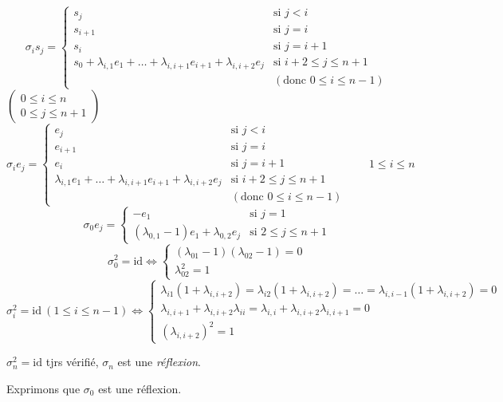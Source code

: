 \documentclass[11pt,a4paper]{article}
\begin{document}
\[
\sigma_i s_j =
\begin{cases}
s_j & \text{si } j<i \\
s_{i+1} & \text{si } j=i \\
s_i & \text{si } j=i+1 \\
s_0+\lambda_{i,1}e_1+\dots+\lambda_{i,i+1}e_{i+1}+\lambda_{i,i+2}e_j & \text{si } i+2\leq j\leq n+1 \\
 & (\text{donc } 0\leq i\leq n-1)
\end{cases}
\]
$\begin{pmatrix} 0\leq i\leq n \\ 0\leq j\leq n+1 \end{pmatrix}$ 
\[
\sigma_i e_j =
\begin{cases}
e_j & \text{si } j<i \\
e_{i+1} & \text{si } j=i \\
e_i & \text{si } j=i+1 \\
\lambda_{i,1}e_1+\dots+\lambda_{i,i+1}e_{i+1}+\lambda_{i,i+2}e_j & \text{si } i+2\leq j\leq n+1 \\
 & (\text{donc } 0\leq i\leq n-1)
\end{cases}
\qquad 1\leq i\leq n
\]
\[
\sigma_0 e_j =
\begin{cases}
-e_1 & \text{si } j=1 \\
(\lambda_{0,1}-1)e_1+\lambda_{0,2}e_j & \text{si } 2\leq j\leq n+1
\end{cases}
\]
\[
\sigma_0^2=\mathrm{id} \iff
\begin{cases}
(\lambda_{01}-1)(\lambda_{02}-1)=0 \\
\lambda_{02}^2=1
\end{cases}
\]
\[
\sigma_i^2=\mathrm{id} \ (1\leq i\leq n-1) \iff
\begin{cases}
\lambda_{i1}(1+\lambda_{i,i+2}) = \lambda_{i2}(1+\lambda_{i,i+2}) = \dots = \lambda_{i,i-1}(1+\lambda_{i,i+2}) = 0 \\
\lambda_{i,i+1}+\lambda_{i,i+2}\lambda_{ii} = \lambda_{i,i}+\lambda_{i,i+2}\lambda_{i,i+1} = 0 \\
(\lambda_{i,i+2})^2 = 1
\end{cases}
\]

$\sigma_n^2=\mathrm{id}$ tjrs vérifié, $\sigma_n$ est une \emph{réflexion}.

Exprimons que $\sigma_0$ est une réflexion.
\end{document}
